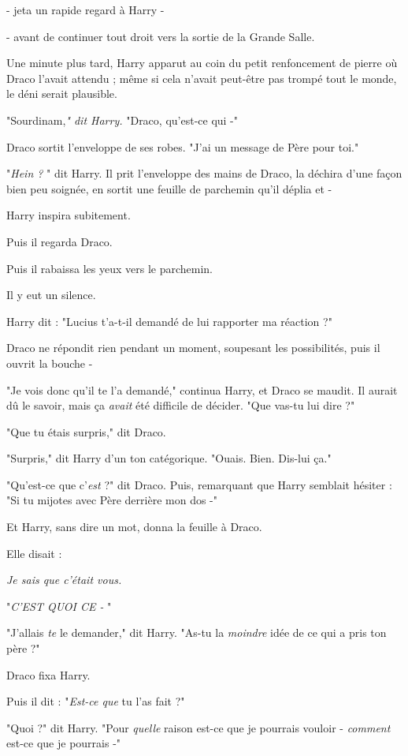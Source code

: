 - jeta un rapide regard à Harry -

- avant de continuer tout droit vers la sortie de la Grande Salle.

Une minute plus tard, Harry apparut au coin du petit renfoncement de pierre où Draco l'avait attendu ; même si cela n'avait peut-être pas trompé tout le monde, le déni serait plausible.

"Sourdinam,\emph{" dit Harry.}  "Draco, qu'est-ce qui -"

Draco sortit l'enveloppe de ses robes. "J'ai un message de Père pour toi."

"\emph{Hein ?} " dit Harry. Il prit l'enveloppe des mains de Draco, la déchira d'une façon bien peu soignée, en sortit une feuille de parchemin qu'il déplia et -

Harry inspira subitement.

Puis il regarda Draco.

Puis il rabaissa les yeux vers le parchemin.

Il y eut un silence.

Harry dit : "Lucius t'a-t-il demandé de lui rapporter ma réaction ?"

Draco ne répondit rien pendant un moment, soupesant les possibilités, puis il ouvrit la bouche -

"Je vois donc qu'il te l'a demandé," continua Harry, et Draco se maudit. Il aurait dû le savoir, mais ça \emph{avait}  été difficile de décider. "Que vas-tu lui dire ?"

"Que tu étais surpris," dit Draco.

"Surpris," dit Harry d'un ton catégorique. "Ouais. Bien. Dis-lui ça."

"Qu'est-ce que c'\emph{est}  ?" dit Draco. Puis, remarquant que Harry semblait hésiter : "Si tu mijotes avec Père derrière mon dos -"

Et Harry, sans dire un mot, donna la feuille à Draco.

Elle disait :

\emph{Je sais que c'était vous.} 

"\emph{C'EST QUOI CE -} "

"J'allais \emph{te } le demander," dit Harry. "As-tu la \emph{moindre}  idée de ce qui a pris ton père ?"

Draco fixa Harry.

Puis il dit : "\emph{Est-ce que}  tu l'as fait ?"

"Quoi ?" dit Harry. "Pour \emph{quelle } raison est-ce que je pourrais vouloir - \emph{comment}  est-ce que je pourrais -"

